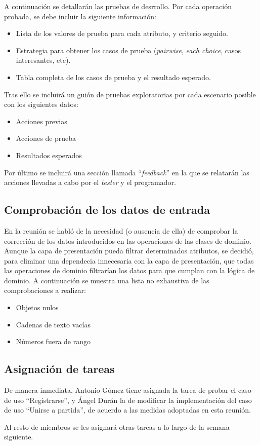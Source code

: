 \documentclass[a4paper,11pt,oneside]{article}
\begin{document}
A continuación se detallarán las pruebas de desrrollo. Por cada operación
probada, se debe incluir la siguiente información:

\begin{itemize}
\item Lista de los valores de prueba para cada atributo, y criterio seguido.
\item Estrategia para obtener los casos de prueba (\textit{pairwise},
\textit{each choice}, casos interesantes, etc).
\item Tabla completa de los casos de prueba y el resultado esperado.
\end{itemize}

Tras ello se incluirá un guión de pruebas exploratorias por cada escenario
posible con los siguientes datos:

\begin{itemize}
\item Acciones previas
\item Acciones de prueba
\item Resultados esperados
\end{itemize}

Por último se incluirá una sección llamada ``\textit{feedback}'' en la que se
relatarán las acciones llevadas a cabo por el \textit{tester} y el programador.

\subsection*{Comprobación de los datos de entrada}

En la reunión se habló de la necesidad (o ausencia de ella) de comprobar la
corrección de los datos introducidos en las operaciones de las clases de
dominio. Aunque la capa de presentación pueda filtrar determinados atributos,
se decidió, para eliminar una dependecia innecesaria con la capa de
presentación, que todas las operaciones de dominio filtrarían los datos para
que cumplan con la lógica de dominio. A continuación se muestra una lista no
exhaustiva de las comprobaciones a realizar:

\begin{itemize}
\item Objetos nulos
\item Cadenas de texto vacías
\item Números fuera de rango
\end{itemize}

\subsection*{Asignación de tareas}

De manera inmediata, Antonio Gómez tiene asignada la tarea de probar el caso de
uso ``Registrarse'', y Ángel Durán la de modificar la implementación del caso
de uso ``Unirse a partida'', de acuerdo a las medidas adoptadas en esta reunión.

Al resto de miembros se les asignará otras tareas a lo largo de la semana
siguiente.
\end{document}
